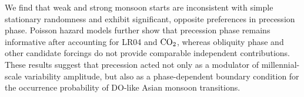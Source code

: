 \documentclass[11pt]{article}
\begin{document}
We find that weak and strong monsoon starts are inconsistent with simple stationary randomness and exhibit significant, opposite preferences in precession phase. Poisson hazard models further show that precession phase remains informative after accounting for LR04 and \(\ce{CO2}\), whereas obliquity phase and other candidate forcings do not provide comparable independent contributions. These results suggest that precession acted not only as a modulator of millennial-scale variability amplitude, but also as a phase-dependent boundary condition for the occurrence probability of DO-like Asian monsoon transitions.
\end{document}
